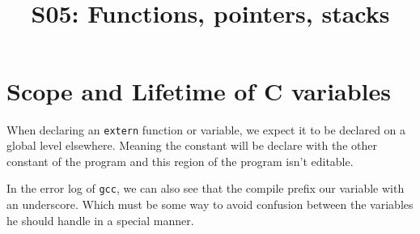 


\title{
    \unilogo[0.3\textwidth]\\[0.9cm]
    S05: Functions, pointers, stacks
}

\author{\thestudent\theprof}
\lhead{\unilogo}
\rhead{\thestudent\\\theseriesnumber}


% 


\pgfplotsset{compat=newest}

\lstset{
    language=C,
    basicstyle=\footnotesize,
    stepnumber=3,
    firstnumber=1,
}

\raggedbottom %


\maketitle
\section*{\theseriesnumber}

%
%
\section{Scope and Lifetime of C variables}


When declaring an \verb!extern! function or variable, we expect it to be declared on a global level elsewhere. Meaning the constant will be declare with the other constant of the program and this region of the program isn't editable.

In the error log of \verb!gcc!, we can also see that the compile prefix our variable with an underscore.
Which must be some way to avoid confusion between the variables he should handle in a special manner.

